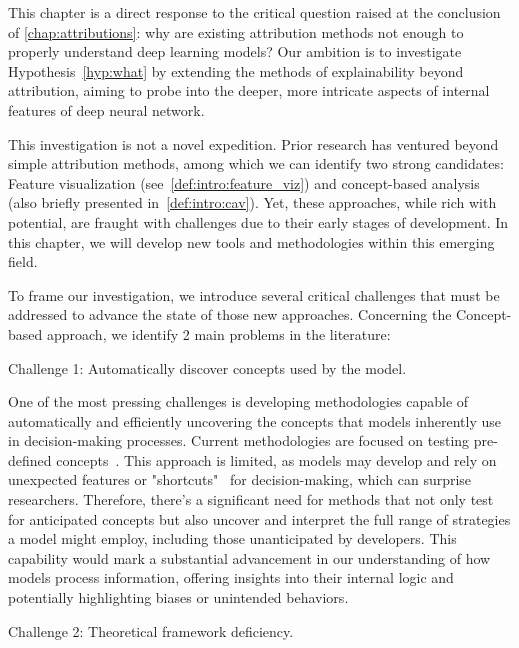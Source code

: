 This chapter is a direct response to the critical question raised at the conclusion of \autoref{chap:attributions}: why are existing attribution methods not enough to properly understand deep learning models? Our ambition is to investigate Hypothesis~\ref{hyp:what} by extending the methods of explainability beyond  attribution, aiming to probe into the deeper, more intricate aspects of internal features of deep neural network.

This investigation is not a novel expedition. Prior research has ventured beyond simple attribution methods, among which we can identify two strong candidates: Feature visualization (see~\autoref{def:intro:feature_viz}) and concept-based analysis (also briefly presented in~\autoref{def:intro:cav}). Yet, these approaches, while rich with potential, are fraught with challenges due to their early stages of development. In this chapter, we will develop new tools and methodologies within this emerging field.

To frame our investigation, we introduce several critical challenges that must be addressed to advance the state of those new approaches. Concerning the Concept-based approach, we identify 2 main problems in the literature:

\begin{customchallenge}{Challenge 1: Automatically discover concepts used by the model.}
\end{customchallenge}

One of the most pressing challenges is developing methodologies capable of automatically and efficiently uncovering the concepts that models inherently use in decision-making processes. Current methodologies are  focused on testing pre-defined concepts~\cite{kim2018interpretability}. This approach is limited, as models may develop and rely on unexpected features or "shortcuts"~\cite{geirhos2020shortcut} for decision-making, which can surprise researchers. Therefore, there's a significant need for methods that not only test for anticipated concepts but also uncover and interpret the full range of strategies a model might employ, including those unanticipated by developers. This capability would mark a substantial advancement in our understanding of how models process information, offering insights into their internal logic and potentially highlighting biases or unintended behaviors. 

\begin{customchallenge}{Challenge 2: Theoretical framework deficiency.}
\end{customchallenge}

